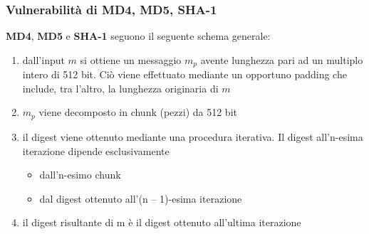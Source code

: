 \subsubsection{Vulnerabilità di MD4, MD5, SHA-1}
\textbf{MD4}, \textbf{MD5} e \textbf{SHA-1} seguono il seguente schema generale:
\begin{enumerate}
\item dall'input $m$ si ottiene un messaggio $m_p$ avente lunghezza pari ad un multiplo intero di 512 bit. Ciò viene effettuato mediante un opportuno padding che include, tra l'altro, la lunghezza originaria di $m$
\item $m_p$ viene decomposto in chunk (pezzi) da 512 bit
\item il digest viene ottenuto mediante una procedura iterativa. Il digest all'n-esima iterazione dipende esclusivamente
\begin{itemize}
	\item dall'n-esimo chunk
	\item dal digest ottenuto all'(n – 1)-esima iterazione
\end{itemize}
\item il digest risultante di m è il digest ottenuto all'ultima iterazione
\end{enumerate}

